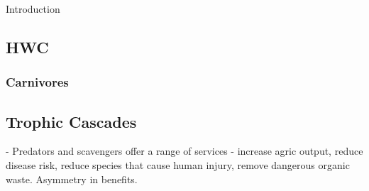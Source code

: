 Introduction

\subsection{HWC}

\subsubsectionHerbivores

\subsubsection{Carnivores}

\subsection{Trophic Cascades}

\cite{O_Bryan_2018} - Predators and scavengers offer a range of services - increase agric output, reduce disease risk, reduce species that cause human injury, remove dangerous organic waste. Asymmetry in benefits.


